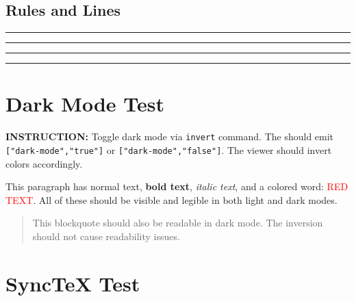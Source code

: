\documentclass[12pt,a4paper]{article}
\begin{document}
\begin{center}
\colorbox{red!20}{\rule{0pt}{30pt}\hspace{30pt}}
\colorbox{blue!20}{\rule{0pt}{30pt}\hspace{30pt}}
\colorbox{green!20}{\rule{0pt}{30pt}\hspace{30pt}}
\colorbox{yellow!20}{\rule{0pt}{30pt}\hspace{30pt}}
\colorbox{orange!20}{\rule{0pt}{30pt}\hspace{30pt}}
\colorbox{purple!20}{\rule{0pt}{30pt}\hspace{30pt}}
\end{center}

\subsection{Rules and Lines}

\noindent\rule{\textwidth}{0.4pt}

\vspace{1em}
\noindent\rule{\textwidth}{2pt}

\vspace{1em}
\noindent\rule[2pt]{0.5\textwidth}{0.4pt}\hfill\rule[2pt]{0.3\textwidth}{0.4pt}

\section{Dark Mode Test}
\label{sec:darkmode}

\textbf{INSTRUCTION:} Toggle dark mode via \texttt{invert} command.
The should emit \texttt{["dark-mode","true"]} or \texttt{["dark-mode","false"]}.
The viewer should invert colors accordingly.

This paragraph has normal text, \textbf{bold text}, \textit{italic text},
and a colored word: \textcolor{red}{RED TEXT}. All of these should be
visible and legible in both light and dark modes.

\begin{quote}
This blockquote should also be readable in dark mode.
The inversion should not cause readability issues.
\end{quote}

\section{SyncTeX Test}
\label{sec:synctex}
\end{document}
